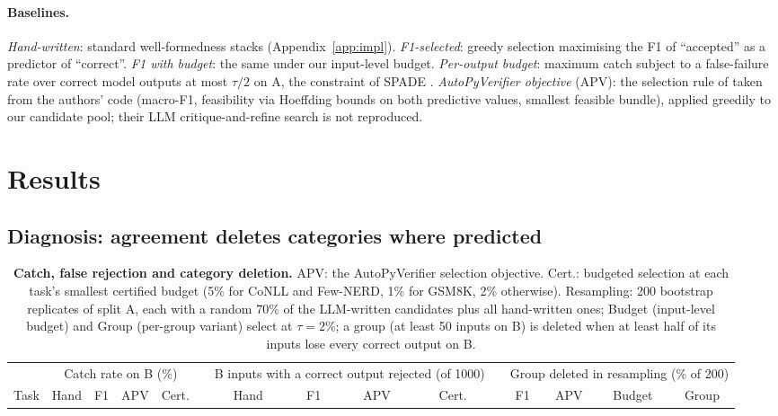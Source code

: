 \documentclass[11pt]{article}
\begin{document}
\paragraph{Baselines.} \emph{Hand-written}: standard well-formedness stacks
(Appendix~\ref{app:impl}). \emph{F1-selected}: greedy selection
maximising the F1 of ``accepted'' as a predictor of ``correct''.
\emph{F1 with budget}: the same under our input-level budget.
\emph{Per-output budget}: maximum catch subject to a false-failure rate
over correct model outputs at most $\tau/2$ on A, the constraint of SPADE
\citep{shankar2024spade}.
\emph{AutoPyVerifier objective} (APV): the selection rule of
\citet{autopyverifier2026} taken from the authors' code (macro-F1,
feasibility via Hoeffding bounds on both predictive values, smallest
feasible bundle), applied greedily to our candidate pool; their LLM
critique-and-refine search is not reproduced.

\section{Results}\label{sec:results}
\subsection{Diagnosis: agreement deletes categories where predicted}\label{sec:deletion}

\begin{table}[t]\centering\footnotesize
\setlength{\tabcolsep}{3.4pt}
\begin{tabular}{@{}l cccc c cccc c cccc@{}}
\toprule
& \multicolumn{4}{c}{Catch rate on B (\%)} & & \multicolumn{4}{c}{B inputs with a correct output rejected (of 1000)} & & \multicolumn{4}{c}{Group deleted in resampling (\% of 200)} \\
\cmidrule(lr){2-5}\cmidrule(lr){7-10}\cmidrule(lr){12-15}
Task & Hand & F1 & APV & Cert. & & Hand & F1 & APV & Cert. & & F1 & APV & Budget & Group \\
\midrule

\bottomrule
\end{tabular}
\caption{\textbf{Catch, false rejection and category deletion.} APV: the
AutoPyVerifier selection objective. Cert.: budgeted selection at each
task's smallest certified budget (5\% for CoNLL and Few-NERD, 1\% for
GSM8K, 2\% otherwise). Resampling: 200 bootstrap replicates of split A,
each with a random 70\% of the LLM-written candidates plus all hand-written
ones; Budget (input-level budget) and Group (per-group variant) select at
$\tau=2\%$; a group (at least 50 inputs on
B) is deleted when at least half of its inputs lose every correct output
on B.}
\label{tab:safety}
\end{table}
\end{document}
